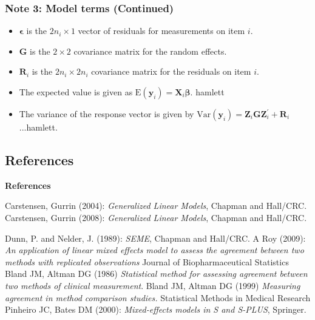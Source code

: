 \documentclass[compress]{beamer}        %
\makeatletter
\newcommand{\tcb}{\textcolor{beamer@blendedblue}}
\makeatother
\begin{document}
\begin{frame}
\frametitle{Note 3: Model terms (Continued) }
\begin{itemize}
\item $\boldsymbol{\epsilon}$  is the $2n_i \times  1$ vector of residuals for measurements on item $i$.
\item $\boldsymbol{G}$ is the $2 \times  2$ covariance matrix for the random effects.
\item $\boldsymbol{R}_i$ is the $2n_i \times  2n_i$ covariance matrix for the residuals on item $i$.
\item The expected value is given as $\mbox{E}(\boldsymbol{y}_i) = \boldsymbol{X}_i\boldsymbol{\beta}.$ \alert{hamlett}
\item The variance of the response vector is given by $\mbox{Var}(\boldsymbol{y}_i)  = \boldsymbol{Z}_i \boldsymbol{G} \boldsymbol{Z}_i^{\prime} + \boldsymbol{R}_i$ ...\alert{hamlett}.
\end{itemize}
\end{frame}

\subsection{References}
\begin{frame}{\bf \tcb{References}}
\begin{thebibliography}{99}

 Carstensen, Gurrin (2004): \emph{Generalized Linear Models},
Chapman and Hall/CRC.
 Carstensen, Gurrin (2008): \emph{Generalized Linear Models},
Chapman and Hall/CRC.

 Dunn, P. and Nelder, J. (1989): \emph{SEME},
Chapman and Hall/CRC.
 A Roy (2009): \emph{An application of linear mixed effects model to assess the agreement between two methods with replicated observations} Journal of Biopharmaceutical Statistics
 Bland JM, Altman DG (1986) \emph{Statistical method for assessing agreement between two methods of clinical measurement}.
 Bland JM, Altman DG (1999)  \emph{Measuring agreement in method comparison studies.} Statistical Methods in Medical Research
 Pinheiro JC, Bates DM (2000): \emph{Mixed-effects models in S and S-PLUS},
Springer.
\end{thebibliography}
\end{frame}
\end{document}
